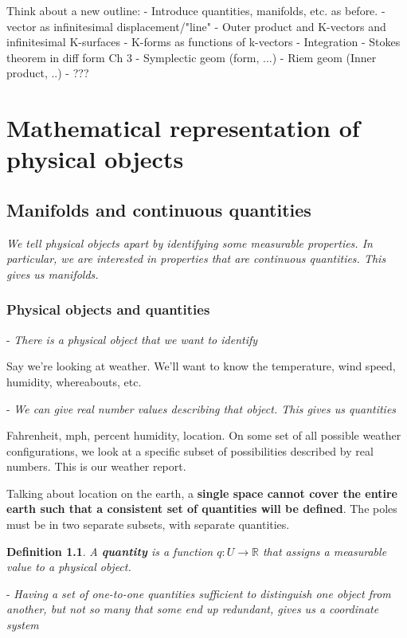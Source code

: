 \documentclass{book}
\newtheorem{defn}[equation]{Definition}
\begin{document}
\tableofcontents


Think about a new outline: 
- Introduce quantities, manifolds, etc. as before. 
- vector as infinitesimal displacement/"line"
- Outer product and K-vectors and infinitesimal K-surfaces
- K-forms as functions of k-vectors
- Integration
- Stokes theorem in diff form
Ch 3
- Symplectic geom (form, ...)
- Riem geom (Inner product, ..)
- ???


\chapter{Mathematical representation of physical objects}



\section{Manifolds and continuous quantities}
\emph{We tell physical objects apart by identifying some measurable properties. In particular, we are interested in properties that are continuous quantities. This gives us manifolds.}

\subsection{Physical objects and quantities}

- \emph{There is a physical object that we want to identify}

Say we're looking at weather. We'll want to know the temperature, wind speed, humidity, whereabouts, etc.

- \emph{We can give real number values describing that object. This gives us quantities}

Fahrenheit, mph, percent humidity, location.
On some set of all possible weather configurations, we look at a specific subset of possibilities described by real numbers. This is our weather report.  

Talking about location on the earth, a \textbf{single space cannot cover the entire earth such that a consistent set of quantities will be defined}. The poles must be in two separate subsets, with separate quantities. 

\begin{defn}
	A \textbf{quantity} is a function $q : U \to \mathbb{R}$ that assigns a measurable value to a physical object.
\end{defn}


- \emph{Having a set of one-to-one quantities sufficient to distinguish one object from another, but not so many that some end up redundant, gives us a coordinate system}
\end{document}
